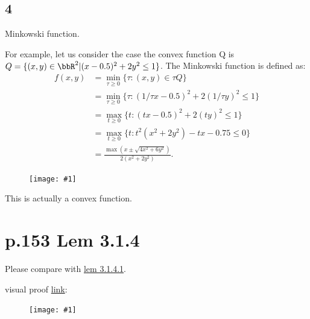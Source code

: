 \documentclass[a4paper, 14pt, dvipdfmx]{extarticle}
\newcommand{\IMG}[2]{
    \begin{figure}[H]
        \centering
        \texttt{[image: \#1]}
    \end{figure}
}
\begin{document}
\subsection*{4}

Minkowski function.

For example, let us consider the case the convex function Q is $Q = \{ (x,y) \in \bbR^2 | (x-0.5)^2 + 2y^2 \leq 1 \}$.
The Minkowski function is defined as:
\begin{align*}
    f(x,y) & = \min_{\tau \geq 0} \{ \tau : (x,y) \in \tau Q \}                          \\
           & = \min_{\tau \geq 0} \{ \tau : (1/\tau x - 0.5)^2 + 2(1/\tau y)^2 \leq 1 \} \\
           & = \max_{t \geq 0} \{ t : (tx-0.5)^2 + 2(ty)^2 \leq 1 \}                     \\
           & = \max_{t \geq 0} \{ t : t^2(x^2+2y^2) - tx - 0.75 \leq 0 \}                \\
           & = \frac{\max(x \pm \sqrt{4x^2+6y^2})}{2(x^2+2y^2)}.
\end{align*}

\IMG{Minkowski.pdf}{0.8}

This is actually a convex function.

\section*{p.153 Lem 3.1.4}\label{lem:3.1.4}

Please compare with \href{lem:3.1.4.1}{lem 3.1.4.1}.

visual proof \href{https://math.stackexchange.com/questions/258511/prove-that-every-convex-function-is-continuous}{link}:
\IMG{stackExchange.png}{0.8}
\end{document}

